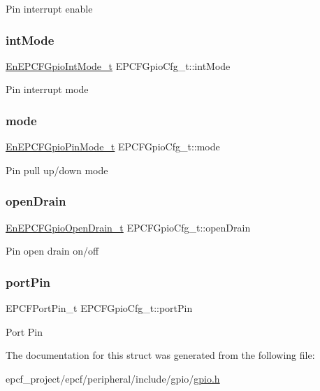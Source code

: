 Pin interrupt enable \mbox{\label{structEPCFGpioCfg__t_a2c37754fe090e872868d3dcf6e585561}} 
\subsubsection{\texorpdfstring{int\+Mode}{intMode}}
{\footnotesize\ttfamily \mbox{\hyperlink{gpio_8h_a8c60a8869509cbc9a1cf56ad8d8ae037}{En\+E\+P\+C\+F\+Gpio\+Int\+Mode\+\_\+t}} E\+P\+C\+F\+Gpio\+Cfg\+\_\+t\+::int\+Mode}

Pin interrupt mode \mbox{\label{structEPCFGpioCfg__t_a14e2373a72e518a95aaca60121a91e07}} 
\subsubsection{\texorpdfstring{mode}{mode}}
{\footnotesize\ttfamily \mbox{\hyperlink{gpio_8h_afa0f233ad1316f898dabeb77efa64cd6}{En\+E\+P\+C\+F\+Gpio\+Pin\+Mode\+\_\+t}} E\+P\+C\+F\+Gpio\+Cfg\+\_\+t\+::mode}

Pin pull up/down mode \mbox{\label{structEPCFGpioCfg__t_a03d68acb4904365ac0125836b3969054}} 
\subsubsection{\texorpdfstring{open\+Drain}{openDrain}}
{\footnotesize\ttfamily \mbox{\hyperlink{gpio_8h_a7b6f54f410f30de33a00d2a3124a7a01}{En\+E\+P\+C\+F\+Gpio\+Open\+Drain\+\_\+t}} E\+P\+C\+F\+Gpio\+Cfg\+\_\+t\+::open\+Drain}

Pin open drain on/off \mbox{\label{structEPCFGpioCfg__t_aaf636f98b62ebee2dd106ac1a16b01d1}} 
\subsubsection{\texorpdfstring{port\+Pin}{portPin}}
{\footnotesize\ttfamily E\+P\+C\+F\+Port\+Pin\+\_\+t E\+P\+C\+F\+Gpio\+Cfg\+\_\+t\+::port\+Pin}

Port Pin 

The documentation for this struct was generated from the following file\+:\begin{DoxyCompactItemize}
\item 
epcf\+\_\+project/epcf/peripheral/include/gpio/\mbox{\hyperlink{gpio_8h}{gpio.\+h}}\end{DoxyCompactItemize}
